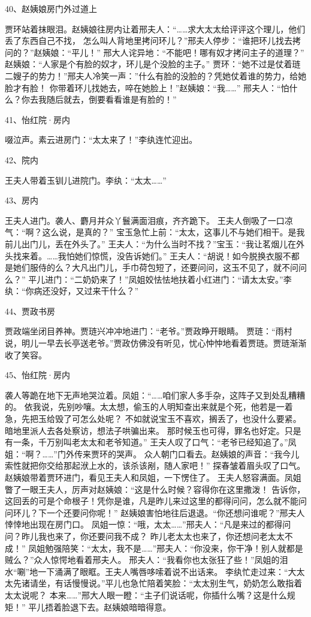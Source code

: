 40、赵姨娘房门外过道上\par
贾环站着抹眼泪。赵姨娘往房内让着邢夫人：“……求大太太给评评这个理儿，他们丢了东西自己不找，
怎么叫人背地里拷问环儿？”邢夫人停步：“谁把环儿找去拷问的？”赵姨娘：“平儿！”
邢大人诧异地：“不能吧！哪有奴才拷问主子的道理？”
赵姨娘：“人家是个有脸的奴才，环儿是个没脸的主子。”
贾环：“她不过是仗着琏二嫂子的势力！”邢夫人冷笑一声：”什么有脸的没脸的？凭她仗着谁的势力，给她脸才有脸！
你带着环儿找她去，啐在她脸上！”赵姨娘：“我……”
邢夫人：“怕什么？你去我随后就去，倒要看看谁是有脸的！”

41、怡红院·房内\par
啜泣声。素云进房门：“太太来了！”李纨连忙迎出。

42、院内\par
王夫人带着玉钏儿进院门。李纨：“太太……”

43、房内\par
王夫人进门。袭人、麝月并众丫鬟满面泪痕，齐齐跪下。
王夫人倒吸了一口凉气：“啊？这么说，是真的？”
宝玉急忙上前：“太太，这事儿不与她们相干。是我前儿出门儿，丢在外头了。”
王夫人：“为什么当时不找？”宝玉：“我让茗烟儿在外头找来着。……我怕她们惊慌，没告诉她们。”
王夫人：“胡说！如今脱换衣服不都是她们服侍的么？大凡出门儿，手巾荷包短了，还要问问，这玉不见了，就不问问么？”
平儿进门：“二奶奶来了！”凤姐姣怯怯地扶着小红进门：“请太太安。”李纨：“你病还没好，又过来干什么？”

44、贾政书房\par
贾政端坐闭目养神。贾琏兴冲冲地进门：“老爷。”贾政睁开眼睛。
贾琏：“雨村说，明儿一早去长亭送老爷。”贾政仿佛没有听见，忧心忡忡地看着贾琏。贾琏渐渐收了笑容。

45、怡红院·房内\par
袭人等跪在地下无声地哭泣着。凤姐：“……咱们家人多手杂，这阵子又到处乱糟糟的。
依我说，先别吵嚷。太太想，偷玉的人明知查出来就是个死，他若是一着急，先把玉给毁了可怎么处呢？
不如就说宝玉不喜欢，搁丢了，也没什么要紧。暗地里派人去各处察访，想法子哄骗出来。
那时候玉也可得，罪名也好定。只是有一条，千万别叫老太太和老爷知道。”
王夫人叹了口气：“老爷已经知追了。”凤姐：“啊？……”门外传来贾环的哭声。
众人朝门口看去。赵姨娘的声音：“我今儿索性就把你交给那起洑上水的，该杀该剐，随人家吧！”
探春皱着眉头叹了口气。赵姨娘带着贾环进门，看见王夫人和凤姐，一下愣住了。
王夫人怒容满面。凤姐瞥了一眼王夫人，厉声对赵姨娘：“这是什么时候？容得你在这里撒泼！
告诉你，这回丢的可是个命根子！凭你是谁，凡是昨儿来过这里的都得问问，怎么就不能问问环儿？下一个还要问你呢！”
赵姨娘害怕地往后退退。“你还想问谁呢？”邢夫人悻悻地出现在房门口。
凤姐一惊：“哦，太太……”邢夫人：“凡是来过的都得问问？昨儿我也来了，你还要问我不成？
昨儿老太太也来了，你还想问老太太不成！”
凤姐勉强陪笑：“太太，我不是……”邢夫人：“你没来，你干净！别人就都是贼么？”众人惊愕地看着邢夫人。
邢夫人：“我看你也太张狂了些！”凤姐的泪水“唰”地一下涌满了眼眶。王夫人嘴唇哆嗦着说不出话来。
李纨忙走过来：“大太太先诸请坐，有话慢慢说。”平儿也急忙陪着笑脸：“太太别生气，奶奶怎么敢指着太太说呢？
本来……”邢大人眼一瞪：“主子们说话呢，你插什么嘴？这是什么规矩！”
平儿捂着脸退下去。赵姨娘暗暗得意。

